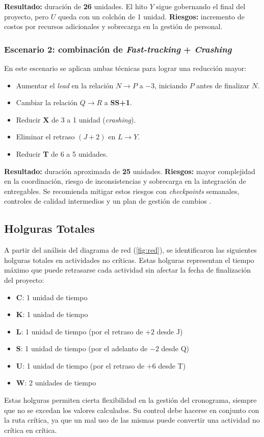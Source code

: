 \textbf{Resultado:} duración de \textbf{26} unidades. El hito \(Y\) sigue gobernando el final del proyecto, pero \(U\) queda con un colchón de 1 unidad.  
\textbf{Riesgos:} incremento de costos por recursos adicionales y sobrecarga en la gestión de personal.

\subsubsection*{Escenario 2: combinación de \emph{Fast-tracking} + \emph{Crashing}}

En este escenario se aplican ambas técnicas para lograr una reducción mayor:

\begin{itemize}
    \item Aumentar el \emph{lead} en la relación \(N \rightarrow P\) a \(-3\), iniciando \(P\) antes de finalizar \(N\).
    \item Cambiar la relación \(Q \rightarrow R\) a \textbf{SS+1}.
    \item Reducir \textbf{X} de 3 a 1 unidad (\emph{crashing}).
    \item Eliminar el retraso \((J{+}2)\) en \(L \rightarrow Y\).
    \item Reducir \textbf{T} de 6 a 5 unidades.
\end{itemize}

\textbf{Resultado:} duración aproximada de \textbf{25} unidades.  
\textbf{Riesgos:} mayor complejidad en la coordinación, riesgo de inconsistencias y sobrecarga en la integración de entregables.  
Se recomienda mitigar estos riesgos con \emph{checkpoints} semanales, controles de calidad intermedios y un plan de gestión de cambios \cite{PMBOK,Kerzner2017}.

\subsection{Holguras Totales}

A partir del análisis del diagrama de red (\cref{fig:red}), se identificaron las siguientes
holguras totales en actividades no críticas. Estas holguras representan el tiempo máximo
que puede retrasarse cada actividad sin afectar la fecha de finalización del proyecto:

\begin{itemize}
    \item \textbf{C}: 1 unidad de tiempo
    \item \textbf{K}: 1 unidad de tiempo
    \item \textbf{L}: 1 unidad de tiempo (por el retraso de \(+2\) desde J)
    \item \textbf{S}: 1 unidad de tiempo (por el adelanto de \(-2\) desde Q)
    \item \textbf{U}: 1 unidad de tiempo (por el retraso de \(+6\) desde T)
    \item \textbf{W}: 2 unidades de tiempo
\end{itemize}

Estas holguras permiten cierta flexibilidad en la gestión del cronograma, siempre que no
se excedan los valores calculados. Su control debe hacerse en conjunto con la ruta crítica,
ya que un mal uso de las mismas puede convertir una actividad no crítica en crítica.

